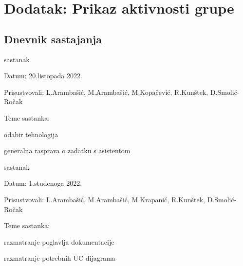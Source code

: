 \chapter*{Dodatak: Prikaz aktivnosti grupe}
		
		\section*{Dnevnik sastajanja}
		
		
		
		\begin{packed_enum}
			\item  sastanak
			\item[] \begin{packed_item}
				\item Datum: 20.listopada 2022.
				\item Prisustvovali: L.Arambašić, M.Arambašić, M.Kopačević, R.Kunštek, D.Smolić-Ročak
				\item Teme sastanka:
				\begin{packed_item}
					\item  odabir tehnologija
					\item  generalna rasprava o zadatku s asistentom
				\end{packed_item}
			\end{packed_item}
			
			\item  sastanak
			\item[] \begin{packed_item}
				\item Datum: 1.studenoga 2022.
				\item Prisustvovali: L.Arambašić, M.Arambašić, M.Krapanić, R.Kunštek, D.Smolić-Ročak
				\item Teme sastanka:
				\begin{packed_item}
					\item  razmatranje poglavlja dokumentacije
					\item  razmatranje potrebnih UC dijagrama
				\end{packed_item}
			\end{packed_item}
		

\end{packed_enum}
